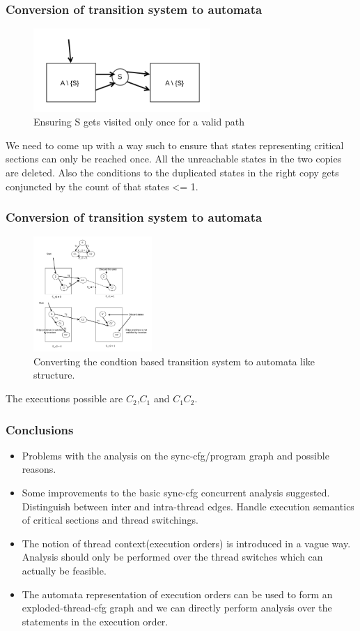 \documentclass{beamer}
\begin{document}
\begin{frame}
	\frametitle{Conversion of transition system to automata}
	\begin{figure}
		\centering
		\includegraphics[width=0.6\textwidth]{Figures/automata_state.png}
		\caption{Ensuring S gets visited only once for a valid path}
		\label{fig:ch5example}
	\end{figure}
	We need to come up with a way such to ensure that states representing critical sections can only be reached once. All the unreachable states in the two copies are deleted. Also the conditions to the duplicated states in the right copy gets conjuncted by the count of that states \textless= 1.
\end{frame}

\begin{frame}
	\frametitle{Conversion of transition system to automata}
	\begin{figure}
		\centering
		\includegraphics[width=0.4\textwidth]{Figures/automata_conv.png}
		\caption{Converting the condtion based transition system to automata like structure.}
		\label{fig:ch5example}
	\end{figure}
	The executions possible are $C_2$,$C_1$ and $C_1$$C_2$.
\end{frame}

\begin{frame}
	\frametitle{Conclusions}
	\begin{itemize}
	\item Problems with the analysis on the sync-cfg/program graph and possible reasons. 
	\item Some improvements to the basic sync-cfg concurrent analysis suggested. Distinguish between inter and intra-thread edges. Handle execution semantics of critical sections and thread switchings.
	\item The notion of thread context(execution orders) is introduced in a vague way. Analysis should only be performed over the thread switches which can actually be feasible. 
	\item The automata representation of execution orders can be used to form an exploded-thread-cfg graph and we can directly perform analysis over the statements in the execution order.
	\end{itemize}
\end{frame}
\end{document}
